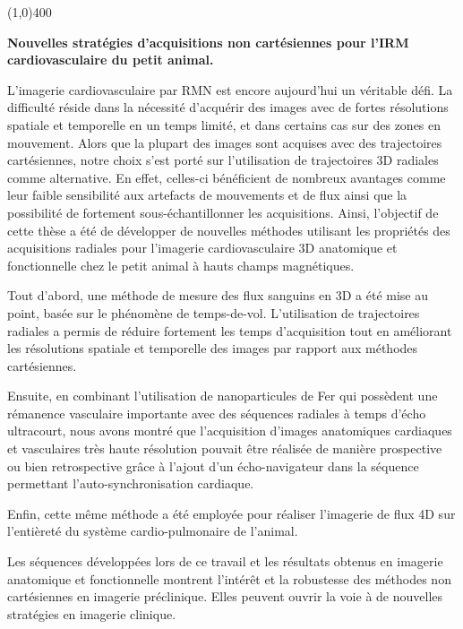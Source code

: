 \thispagestyle{empty}

  
\renewcommand{\baselinestretch}{1}
\line(1,0){400}  \\

\noindent
\small{\textbf{Nouvelles stratégies d'acquisitions non cartésiennes pour l'IRM cardiovasculaire du petit animal.}

L’imagerie cardiovasculaire par RMN est encore aujourd’hui un véritable défi. La difficulté réside dans la nécessité d’acquérir des images avec de fortes résolutions spatiale et temporelle en un temps limité, et dans certains cas sur des zones en mouvement. Alors que la plupart des images sont acquises avec des trajectoires cartésiennes, notre choix s'est porté sur l’utilisation de trajectoires 3D radiales comme alternative. En effet, celles-ci bénéficient de nombreux avantages comme leur faible sensibilité aux artefacts de mouvements et de flux ainsi que la possibilité de fortement sous-échantillonner les acquisitions. Ainsi, l’objectif de cette thèse a été de développer de nouvelles méthodes utilisant les propriétés des acquisitions radiales pour l'imagerie cardiovasculaire 3D anatomique et fonctionnelle chez le petit animal à hauts champs magnétiques.

Tout d'abord, une méthode de mesure des flux sanguins en 3D a été mise au point, basée sur le phénomène de temps-de-vol. L’utilisation de trajectoires radiales a permis de réduire fortement les temps d’acquisition tout en améliorant les résolutions spatiale et temporelle des images par rapport aux méthodes cartésiennes.

Ensuite, en combinant l’utilisation de nanoparticules de Fer qui possèdent une rémanence vasculaire importante avec des séquences radiales à temps d’écho ultracourt, nous avons montré que l’acquisition d’images anatomiques cardiaques et vasculaires très haute résolution pouvait être réalisée de manière prospective ou bien retrospective grâce à l’ajout d’un écho-navigateur dans la séquence permettant l’auto-synchronisation cardiaque.

Enfin, cette même méthode a été employée pour réaliser l’imagerie de flux 4D sur l’entièreté du système cardio-pulmonaire de l’animal.

Les séquences développées lors de ce travail et les résultats obtenus en imagerie anatomique et fonctionnelle montrent l’intérêt et la robustesse des méthodes non cartésiennes en imagerie préclinique. Elles peuvent ouvrir la voie à de nouvelles stratégies en imagerie clinique.

}
